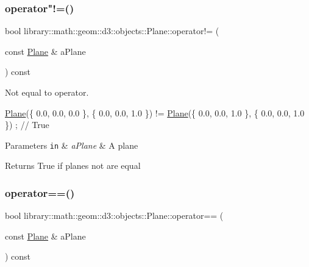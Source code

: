 \subsubsection{\texorpdfstring{operator"!=()}{operator!=()}}
{\footnotesize\ttfamily bool library\+::math\+::geom\+::d3\+::objects\+::\+Plane\+::operator!= (\begin{DoxyParamCaption}\item[{const \hyperlink{classlibrary_1_1math_1_1geom_1_1d3_1_1objects_1_1_plane}{Plane} \&}]{a\+Plane }\end{DoxyParamCaption}) const}



Not equal to operator. 


\begin{DoxyCode}
\hyperlink{classlibrary_1_1math_1_1geom_1_1d3_1_1objects_1_1_plane_a81fe78a983e2cb6ee6ad9bfabd22c3a4}{Plane}(\{ 0.0, 0.0, 0.0 \}, \{ 0.0, 0.0, 1.0 \}) != \hyperlink{classlibrary_1_1math_1_1geom_1_1d3_1_1objects_1_1_plane_a81fe78a983e2cb6ee6ad9bfabd22c3a4}{Plane}(\{ 0.0, 0.0, 1.0 \}, \{ 0.0, 0.0, 1.0 \}) ; \textcolor{comment}{//
       True}
\end{DoxyCode}



\begin{DoxyParams}[1]{Parameters}
\mbox{\tt in}  & {\em a\+Plane} & A plane \\
\hline
\end{DoxyParams}
\begin{DoxyReturn}{Returns}
True if planes not are equal 
\end{DoxyReturn}
\mbox{\label{classlibrary_1_1math_1_1geom_1_1d3_1_1objects_1_1_plane_a9391589825cac1db971b39452b38f8ea}} 
\subsubsection{\texorpdfstring{operator==()}{operator==()}}
{\footnotesize\ttfamily bool library\+::math\+::geom\+::d3\+::objects\+::\+Plane\+::operator== (\begin{DoxyParamCaption}\item[{const \hyperlink{classlibrary_1_1math_1_1geom_1_1d3_1_1objects_1_1_plane}{Plane} \&}]{a\+Plane }\end{DoxyParamCaption}) const}




